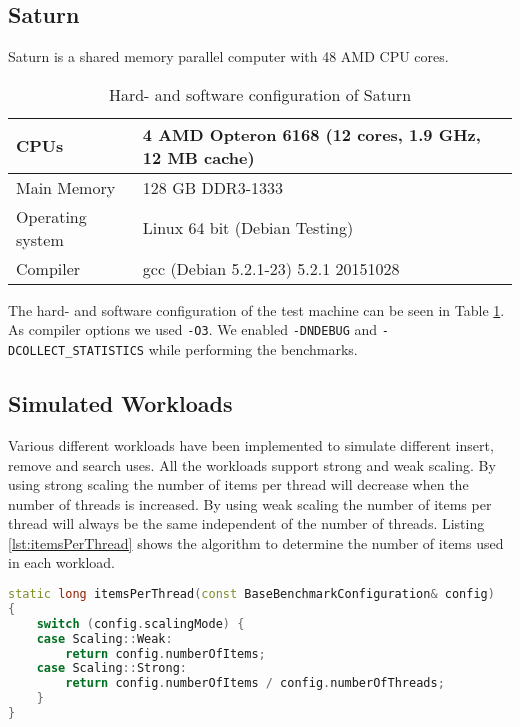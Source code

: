 \subsection{Saturn} \label{subsec:saturn}
Saturn is a shared memory parallel computer with 48 AMD CPU cores.

\begin{table}[H]
  \caption{Hard- and software configuration of Saturn}
  \label{tab:saturn} 
  \begin{center}
    \begin{tabular}{ll}
      CPUs & 4 AMD Opteron 6168 (12 cores, 1.9 GHz, 12 MB cache)\\\hline
      Main Memory & 128 GB DDR3-1333\\\hline
      Operating system & Linux 64 bit (Debian Testing)\\\hline
      Compiler & gcc (Debian 5.2.1-23) 5.2.1 20151028
    \end{tabular}
  \end{center}
\end{table}

\noindent The hard- and software configuration of the test machine can be seen in Table \ref{tab:saturn}. As compiler options we used \verb|-O3|. We enabled \verb|-DNDEBUG| and \verb|-DCOLLECT_STATISTICS| while performing the benchmarks.

\subsection{Simulated Workloads}

Various different workloads have been implemented to simulate different insert, remove and search uses. All the workloads support strong and weak scaling. By using strong scaling the number of items per thread will decrease when the number of threads is increased. By using weak scaling the number of items per thread will always be the same independent of the number of threads. Listing \ref{lst:itemsPerThread} shows the algorithm to determine the number of items used in each workload.

\begin{lstlisting}[language=C++, caption={Items Per Thread depending on the Scaling Mode}, label=lst:itemsPerThread]
static long itemsPerThread(const BaseBenchmarkConfiguration& config)
{
    switch (config.scalingMode) {
    case Scaling::Weak:
        return config.numberOfItems;
    case Scaling::Strong:
        return config.numberOfItems / config.numberOfThreads;
    }
}
\end{lstlisting}

